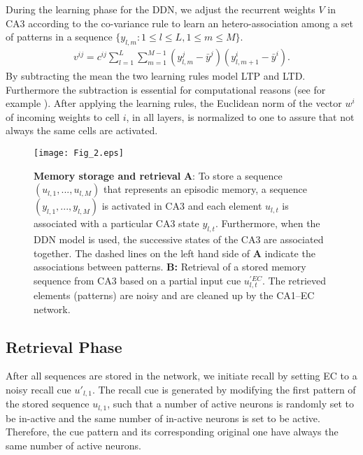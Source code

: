 \documentclass[utf8]{frontiersSCNS} %
\begin{document}
During the learning phase for the DDN, we adjust the recurrent weights $V$ in CA3 according to the co-variance rule \cite{sejnowski1977storing} to learn an hetero-association among a set of patterns in a sequence $\{ y_{l, m}: 1\le l \le L, 1\le m \le M\}$.
\begin{align}
	\label{heteroca3Eq}
	v^{ij} =  c^{ij}\sum_{l=1}^L{\sum_{m=1}^{M-1}(y^j_{l, m}  - \bar {y}^j)(y_{l, m+1}^i - \bar{y}^i)}.
\end{align}
By subtracting the mean the two learning rules model LTP and LTD. Furthermore the subtraction is essential for computational reasons (see for example \cite[chapter 8.2]{amit1992modeling}).
%
After applying the learning rules, the Euclidean norm of the vector $w^i$ of incoming weights to cell $i$, in all layers, is normalized to one to assure that not always the same cells are activated. 
%
\begin{figure}[!htb]
\centering\texttt{[image: Fig\_2.eps]}
\caption{\textbf{Memory storage and retrieval} \textbf A: To store a sequence $(u_{l,1} , . . . ,u_{l,M})$ that represents an episodic memory, a sequence $(y_{l,1} , . . . ,y_{l,M})$ is activated in CA3 and each element $u_{l,t}$ is associated with a particular CA3 state $y_{l,t}$. Furthermore, when the DDN model is used, the successive states of the CA3 are associated together. The dashed lines on the left hand side of \textbf{A} indicate the associations between patterns.  
\textbf{B:} Retrieval of a stored memory sequence from CA3 based on a partial input cue $u^{'EC}_{l,t}$. The retrieved elements (patterns) are noisy and are cleaned up by the CA1–EC network.}
\label{Fig_2}
\end{figure}

\subsection{Retrieval Phase}
\label{S:4}

After all sequences are stored in the network, we initiate recall by setting EC to a noisy recall cue $u'_{l, 1}$. The recall cue is generated by modifying the first pattern of the stored sequence $u_{l, 1}$, such that a number of active neurons is randomly set to be in-active and the same number of in-active neurons is set to be active. 
%
Therefore, the cue pattern and its corresponding original one have always the same number of active neurons. 
\end{document}
